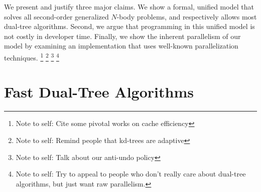 \documentclass[twoside,leqno,twocolumn]{article}
\newcommand{\authornote}[1]{\footnote{Note to self: #1}}
\newcommand{\authorsnote}[1]{\authornote{#1}}
\begin{document}
We present and justify three major claims.
We show a formal, unified model that solves all second-order generalized $N$-body problems, and respectively allows most dual-tree algorithms.
Second, we argue that programming in this unified model is not costly in developer time.
Finally, we show the inherent parallelism of our model by examining an implementation that uses well-known parallelization techniques.
\authorsnote{Cite some pivotal works on cache efficiency}
\authorsnote{Remind people that kd-trees are adaptive}
\authorsnote{Talk about our anti-undo policy}
\authorsnote{Try to appeal to people who don't really care about dual-tree algorithms, but just want raw parallelism.}

\section{Fast Dual-Tree Algorithms}
\end{document}
